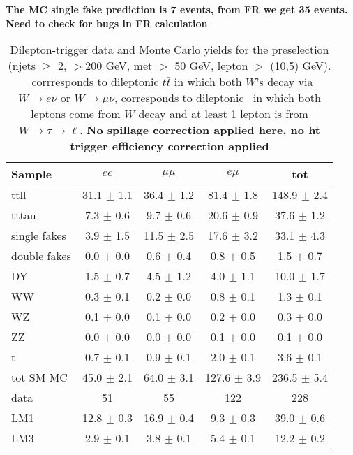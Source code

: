 \begin{table}[htb]
\begin{center}
\caption{\label{tab:yields2}
Dilepton-\Ht trigger data and Monte Carlo yields for the preselection 
(njets $\geq$ 2, \Ht$>$200 GeV, met $>$ 50 GeV, lepton \pt $>$ (10,5) GeV).
\ttll\ corrresponds  to dileptonic $t\bar{t}$ in which both $W$'s decay via $W\rightarrow e\nu$ or
$W\rightarrow \mu\nu$, \tttau corresponds to dileptonic \ttbar\ in which both leptons come from
$W$ decay and at least 1 lepton is from $W \to \tau \to \ell$. 
{\color{red} \bf No spillage correction applied here, no ht trigger efficiency correction applied} }
{\color{red} \bf The MC single fake prediction is 7 events, from FR we get 35 events. Need to check for bugs in FR calculation}
\begin{tabular}{l|cccc}

\hline
         Sample   &           $ee$   &       $\mu\mu$   &         $e\mu$   &            tot  \\
\hline
           ttll   & 31.1 $\pm$ 1.1   & 36.4 $\pm$ 1.2   & 81.4 $\pm$ 1.8   &148.9 $\pm$ 2.4  \\
          tttau   &  7.3 $\pm$ 0.6   &  9.7 $\pm$ 0.6   & 20.6 $\pm$ 0.9   & 37.6 $\pm$ 1.2  \\
   single fakes   &  3.9 $\pm$ 1.5   & 11.5 $\pm$ 2.5   & 17.6 $\pm$ 3.2   & 33.1 $\pm$ 4.3  \\
   double fakes   &  0.0 $\pm$ 0.0   &  0.6 $\pm$ 0.4   &  0.8 $\pm$ 0.5   &  1.5 $\pm$ 0.7  \\
             DY   &  1.5 $\pm$ 0.7   &  4.5 $\pm$ 1.2   &  4.0 $\pm$ 1.1   & 10.0 $\pm$ 1.7  \\
             WW   &  0.3 $\pm$ 0.1   &  0.2 $\pm$ 0.0   &  0.8 $\pm$ 0.1   &  1.3 $\pm$ 0.1  \\
             WZ   &  0.1 $\pm$ 0.0   &  0.1 $\pm$ 0.0   &  0.2 $\pm$ 0.0   &  0.3 $\pm$ 0.0  \\
             ZZ   &  0.0 $\pm$ 0.0   &  0.0 $\pm$ 0.0   &  0.1 $\pm$ 0.0   &  0.1 $\pm$ 0.0  \\
              t   &  0.7 $\pm$ 0.1   &  0.9 $\pm$ 0.1   &  2.0 $\pm$ 0.1   &  3.6 $\pm$ 0.1  \\
\hline
      tot SM MC   & 45.0 $\pm$ 2.1   & 64.0 $\pm$ 3.1   &127.6 $\pm$ 3.9   &236.5 $\pm$ 5.4  \\
\hline
           data   &             51   &             55   &            122   &            228  \\
\hline
            LM1   & 12.8 $\pm$ 0.3   & 16.9 $\pm$ 0.4   &  9.3 $\pm$ 0.3   & 39.0 $\pm$ 0.6  \\
            LM3   &  2.9 $\pm$ 0.1   &  3.8 $\pm$ 0.1   &  5.4 $\pm$ 0.1   & 12.2 $\pm$ 0.2  \\
\hline
\end{tabular}
\end{center}
\end{table}


